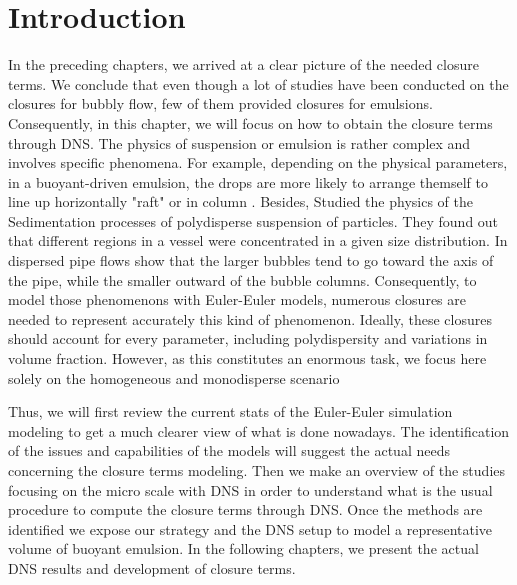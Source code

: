 \section{Introduction}
    

In the preceding chapters, we arrived at a clear picture of the needed closure terms.
We conclude that even though a lot of studies have been conducted on the closures for bubbly flow, few of them provided closures for emulsions.
Consequently, in this chapter, we will focus on how to obtain the closure terms through DNS. 
The physics of suspension or emulsion is rather complex and involves specific phenomena.
For example, depending on the physical parameters, in a buoyant-driven emulsion, the drops are more likely to arrange themself to line up horizontally "raft" or in column \citep{tryggvason2011direct} \citep{guazzelli2011}. 
Besides, \citet{davis1985sedimentation} Studied the physics of the Sedimentation processes of polydisperse suspension of particles. 
They found out that different regions in a vessel were concentrated in a given size distribution.
In dispersed pipe flows \citet{morel2010comparison} show that the larger bubbles tend to go toward the axis of the pipe, while the smaller outward of the bubble columns.
Consequently, to model those phenomenons with Euler-Euler models, numerous closures are needed to represent accurately this kind of phenomenon.
Ideally, these closures should account for every parameter, including polydispersity and variations in volume fraction. However, as this constitutes an enormous task, we focus here solely on the homogeneous and monodisperse scenario   

Thus, we will first review the current stats of the Euler-Euler simulation modeling to get a much clearer view of what is done nowadays.
The identification of the issues and capabilities of the models will suggest the actual needs concerning the closure terms modeling.
Then we make an overview of the studies focusing on the micro scale with DNS in order to understand what is the usual procedure to compute the closure terms through DNS.
Once the methods are identified we expose our strategy and the DNS setup to model a representative volume of buoyant emulsion. 
In the following chapters, we present the actual DNS results and development of closure terms. 

